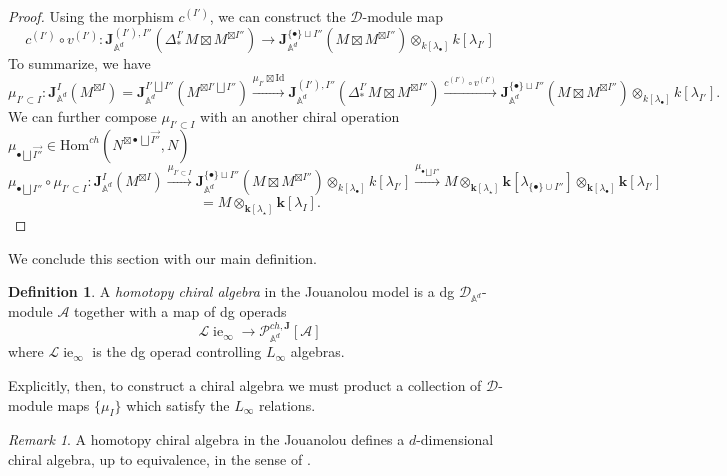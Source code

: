 \documentclass[11pt]{amsart}
\theoremstyle{definition}
\newtheorem{defn}[thm]{Definition}
\theoremstyle{remark}
\newtheorem{rem}[thm]{Remark}
\numberwithin{equation}{section}
\newcommand{\op}{\operatorname}
\begin{document}
\begin{proof}
Using the morphism $c^{(I')}$, we can construct the $\mathcal{D}$-module map 
$$
c^{(I')}\circ v^{(I')}:\mathbf{J}^{({I'}),{{I''}}}_{\mathbb{A}^d}(\Delta^{I'}_*M\boxtimes M^{\boxtimes{I''}})\rightarrow \mathbf{J}^{\{\bullet\}\sqcup{{I''}}}_{\mathbb{A}^d}(M\boxtimes M^{\boxtimes{I''}})\otimes_{k[\lambda_{\bullet}]}k[\lambda_{I'}]
$$
To summarize, we have
$$
\mu_{{I'}\subset {I}}:\mathbf{J}^{{I}}_{\mathbb{A}^d}(M^{\boxtimes{I}})=\mathbf{J}^{{I'}\bigsqcup {I''}}_{\mathbb{A}^d}(M^{\boxtimes{I'}\bigsqcup {I''}})\xrightarrow{\mu_{{I'}}\boxtimes \mathrm{Id}} \mathbf{J}^{({I'}),{{I''}}}_{\mathbb{A}^d}(\Delta^{I'}_*M\boxtimes M^{\boxtimes{I''}})\xrightarrow{c^{(I')}\circ v^{(I')}} \mathbf{J}^{\{\bullet\}\sqcup{{I''}}}_{\mathbb{A}^d}(M\boxtimes M^{\boxtimes{I''}})\otimes_{k[\lambda_{\bullet}]}k[\lambda_{I'}].
$$
We can further compose $\mu_{ I'\subset  I}$ with an another chiral operation $\mu_{\bullet \bigsqcup \vec{I''}}\in \mathrm{Hom}^{ch}(N^{\boxtimes \bullet \bigsqcup \vec{I''}},N)$
\[
\mu_{\bullet \bigsqcup {I''}}\circ\mu_{{I'}\subset {I}}:\mathbf{J}^{{I}}_{\mathbb{A}^d}(M^{\boxtimes{I}})\xrightarrow{\mu_{{I'}\subset {I}}}  \mathbf{J}^{\{\bullet\}\sqcup{{I''}}}_{\mathbb{A}^d}(M\boxtimes M^{\boxtimes{I''}})\otimes_{k[\lambda_{\bullet}]}k[\lambda_{I'}]\xrightarrow{\mu_{\bullet \bigsqcup {I''}}}M\otimes_{\mathbf{k}[\lambda_{\star}]}\mathbf{k}[\lambda_{\{\bullet\}\cup I''}]\otimes_{\mathbf{k}[\lambda_{\bullet}]}\mathbf{k}[\lambda_{I'}]
\]
\[
=M\otimes_{\mathbf{k}[\lambda_{\star}]}\mathbf{k}[\lambda_{I}].
\]

\end{proof}

We conclude this section with our main definition. 

\begin{defn}
  A \textit{homotopy chiral algebra} in the Jouanolou model is a dg $\mathcal{D}_{\mathbb{A}^d}$-module $\mathcal{A}$
  together with a map of dg operads
  \[
\mathcal{L}\!\op{ie}_{\infty}\rightarrow \mathcal{P}^{ch,\mathbf{J}}_{\mathbb{A}^d}[\mathcal{A}]
\]
where $\mathcal{L}\!\op{ie}_{\infty}$ is the dg operad controlling $L_\infty$ algebras.
\end{defn}

Explicitly, then, to construct a chiral algebra we must product a collection of $\mathcal{D}$-module maps $\{\mu_I\}$
which satisfy the $L_\infty$ relations.

\begin{rem}
  A homotopy chiral algebra in the Jouanolou defines a $d$-dimensional chiral algebra, up to equivalence, in the sense of
  \cite{FG}.
\end{rem}
\end{document}
